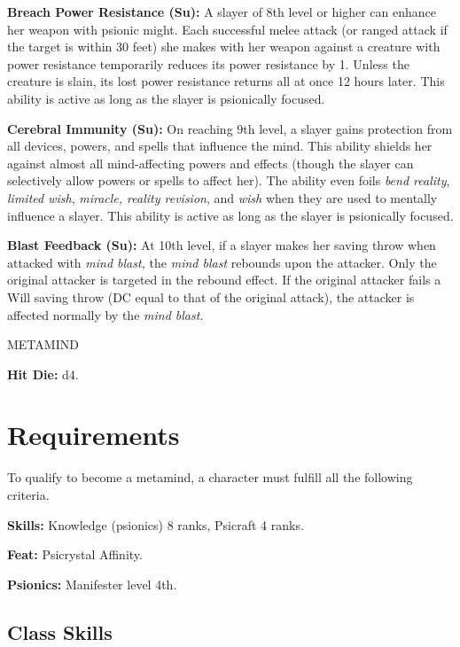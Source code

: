 \documentclass{article}
\begin{document}
\textbf{Breach Power Resistance (Su):} A slayer of 8th level or higher can enhance 
her weapon with psionic might. Each successful melee attack (or ranged attack if 
the target is within 30 feet) she makes with her weapon against a creature with 
power resistance temporarily reduces its power resistance by 1. Unless the creature 
is slain, its lost power resistance returns all at once 12 hours later. This ability 
is active as long as the slayer is psionically focused.

\textbf{Cerebral Immunity (Su):} On reaching 9th level, a slayer gains protection 
from all devices, powers, and spells that influence the mind. This ability shields 
her against almost all mind-affecting powers and effects (though the slayer can 
selectively allow powers or spells to affect her). The ability even foils \textit{bend 
reality}, \textit{limited wish}, \textit{miracle, reality revision}, and \textit{wish 
}when they are used to mentally influence a slayer. This ability is active as long 
as the slayer is psionically focused.

\textbf{Blast Feedback (Su):} At 10th level, if a slayer makes her saving throw 
when attacked with \textit{mind blast, }the \textit{mind blast }rebounds upon the 
attacker. Only the original attacker is targeted in the rebound effect. If the 
original attacker fails a Will saving throw (DC equal to that of the original attack), 
the attacker is affected normally by the \textit{mind blast.}

\vspace{12pt}
{\LARGE{}METAMIND}

\textbf{Hit Die:} d4.

\vspace{12pt}
\section*{\textbf{Requirements}}

To qualify to become a metamind, a character must fulfill all the following criteria.

\textbf{Skills:} Knowledge (psionics) 8 ranks, Psicraft 4 ranks.

\textbf{Feat:} Psicrystal Affinity.

\textbf{Psionics: }Manifester level 4th.

\vspace{12pt}
\subsection*{\textbf{Class Skills}}
\end{document}
